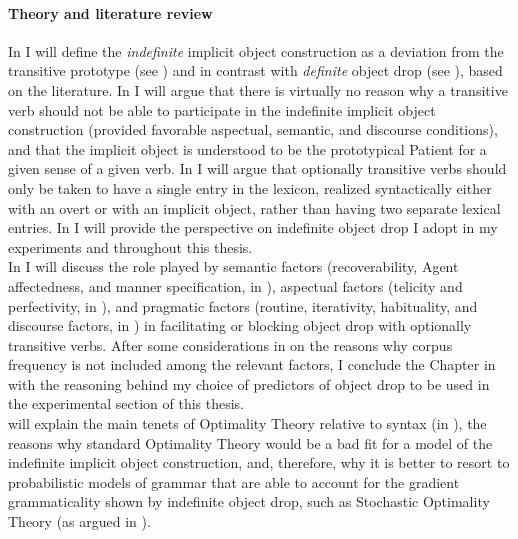 \paragraph{Theory and literature review}
In  I will define the \textit{indefinite} implicit object construction as a deviation from the transitive prototype (see ) and in contrast with \textit{definite} object drop (see ), based on the literature. In  I will argue that there is virtually no reason why a transitive verb should not be able to participate in the indefinite implicit object construction (provided favorable aspectual, semantic, and discourse conditions), and that the implicit object is understood to be the prototypical Patient for a given sense of a given verb. In  I will argue that optionally transitive verbs should only be taken to have a single entry in the lexicon, realized syntactically either with an overt or with an implicit object, rather than having two separate lexical entries. In  I will provide the perspective on indefinite object drop I adopt in my experiments and throughout this thesis.\\
In  I will discuss the role played by semantic factors (recoverability, Agent affectedness, and manner specification, in ), aspectual factors (telicity and perfectivity, in ), and pragmatic factors (routine, iterativity, habituality, and discourse factors, in ) in facilitating or blocking object drop with optionally transitive verbs. After some considerations in  on the reasons why corpus frequency is not included among the relevant factors, I conclude the Chapter in  with the reasoning behind my choice of predictors of object drop to be used in the experimental section of this thesis.\\
 will explain the main tenets of Optimality Theory relative to syntax (in ), the reasons why standard Optimality Theory would be a bad fit for a model of the indefinite implicit object construction, and, therefore, why it is better to resort to probabilistic models of grammar that are able to account for the gradient grammaticality shown by indefinite object drop, such as Stochastic Optimality Theory (as argued in ).\\
